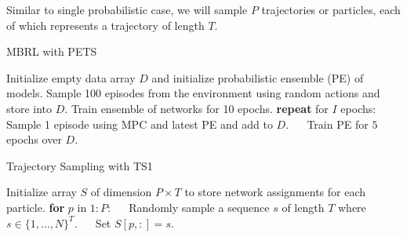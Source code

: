 \documentclass[12pt]{article}
\begin{document}
Similar to single probabilistic case, we will sample $P$ trajectories or particles, each of which represents a trajectory of length $T$.

\begin{algorithm}
\label{alga2c}
\caption{MBRL with PETS\label{pets}}
\begin{algorithmic}[1]
\State Initialize empty data array $D$ and initialize probabilistic ensemble (PE) of models.
\State Sample 100 episodes from the environment using random actions and store into $D$. 
\State Train ensemble of networks for 10 epochs.
\State \textbf{repeat} for $I$ epochs:
\State $\quad$ Sample 1 episode using MPC and latest PE and add to $D$.
\State $\quad$ Train PE for $5$ epochs over $D$.
\EndProcedure
\end{algorithmic}
\end{algorithm}

\begin{algorithm}
\label{alga2c}
\caption{Trajectory Sampling with TS1\label{ts1}}
\begin{algorithmic}[1]
\State Initialize array $S$ of dimension $P\times T$ to store network assignments for each particle.
\State \textbf{for} $p$ in $1:P$:
\State $\quad$ Randomly sample a sequence $s$ of length $T$ where $s\in \{1,\dots,N\}^T$.
\State $\quad$ Set $S[p,:] = s$.
\EndProcedure
\end{algorithmic}
\end{algorithm}

\end{document}
